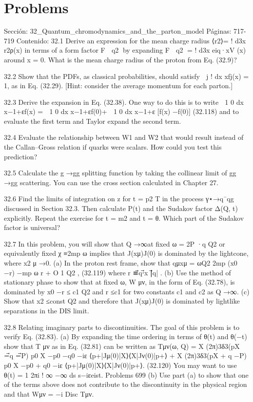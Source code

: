 \section*{Problems}
Sección: 32_Quantum_chromodynamics_and_the_parton_model
Páginas: 717-719
Contenido:
32.1 Derive an expression for the mean charge radius ⟨r2⟩=
!
d3x r2ρ(x) in terms of
a form factor F

q2
by expanding F

q2
=
!
d3x ei⃗q·⃗xV (x) around x = 0. What
is the mean charge radius of the proton from Eq. (32.9)?

32.2 Show that the PDFs, as classical probabilities, should satisfy 
j
!
dx xfj(x) = 1,
as in Eq. (32.29). [Hint: consider the average momentum for each parton.]

32.3 Derive the expansion in Eq. (32.38). One way to do this is to write
 1
0
dx x−1+εf(x) =
 1
0
dx x−1+εf(0)+
 1
0
dx x−1+ε [f(x) −f(0)] (32.118)
and to evaluate the ﬁrst term and Taylor expand the second term.

32.4 Evaluate the relationship between W1 and W2 that would result instead of the
Callan–Gross relation if quarks were scalars. How could you test this prediction?

32.5 Calculate the g →gg splitting function by taking the collinear limit of gg →gg
scattering. You can use the cross section calculated in Chapter 27.

32.6 Find the limits of integration on z for t = p2
T in the process γ⋆→q¯qg discussed
in Section 32.3. Then calculate P(t) and the Sudakov factor Δ(Q, t) explicitly.
Repeat the exercise for t = m2 and t = θ. Which part of the Sudakov factor is
universal?

32.7 In this problem, you will show that Q →∞at ﬁxed ω = 2P ·q
Q2 or equivalently ﬁxed
χ ≡2mp
ω
implies that J(xμ)J(0) is dominated by the lightcone, where x2
μ →0.
(a) In the proton rest frame, show that
qμxμ = ωQ2
2mp
(x0 −r) −mp
ω r + O
1
Q2
,
(32.119)
where r ≡⃗q·⃗x
|⃗q| .
(b) Use the method of stationary phase to show that at ﬁxed ω, W μν, in the form
of Eq. (32.78), is dominated by
x0 −r
≤
c1
Q2 and r ≤c1 for two constants
c1 and c2 as Q →∞.
(c) Show that x2 ≤const
Q2 and therefore that J(xμ)J(0) is dominated by lightlike
separations in the DIS limit.

32.8 Relating imaginary parts to discontinuities. The goal of this problem is to verify
Eq. (32.83).
(a) By expanding the time ordering in terms of θ(t) and θ(−t) show that T μν as
in Eq. (32.81) can be written as
Tμν(ω, Q) =
X
(2π)3δ3(⃗pX −⃗q −⃗P)
p0
X −p0 −q0 −iε
⟨p+|Jμ(0)|X⟩⟨X|Jν(0)|p+⟩
+
X
(2π)3δ3(⃗pX + ⃗q −⃗P)
p0
X −p0 + q0 −iε
⟨p+|Jμ(0)|X⟩⟨X|Jν(0)|p+⟩.
(32.120)
You may want to use θ(t) =
1
2πi
! ∞
−∞
ds
s−iεeist.
Problems
699
(b) Use part (a) to show that one of the terms above does not contribute to the
discontinuity in the physical region and that Wμν = −i Disc Tμν.

